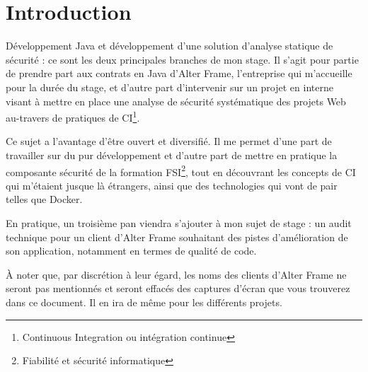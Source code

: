 \section*{Introduction}
Développement Java et développement d'une solution d'analyse statique de sécurité : ce sont les deux principales branches de mon stage. Il s'agit pour partie de prendre part aux contrats en Java d'Alter Frame, l'entreprise qui m'accueille pour la durée du stage, et d'autre part d'intervenir sur un projet en interne visant à mettre en place une analyse de sécurité systématique des projets Web au-travers de pratiques de CI\cite{ci_wiki}\footnote{Continuous Integration ou intégration continue}. 

Ce sujet a l'avantage d'être ouvert et diversifié. Il me permet d'une part de travailler sur du pur développement et d'autre part de mettre en pratique la composante sécurité de la formation FSI\cite{fsi}\footnote{Fiabilité et sécurité informatique}, tout en découvrant les concepts de CI qui m'étaient jusque là étrangers, ainsi que des technologies qui vont de pair telles que Docker.

En pratique, un troisième pan viendra s'ajouter à mon sujet de stage : un audit technique pour un client d'Alter Frame souhaitant des pistes d'amélioration de son application, notamment en termes de qualité de code. 

À noter que, par discrétion à leur égard, les noms des clients d'Alter Frame ne seront pas mentionnés et seront effacés des captures d'écran que vous trouverez dans ce document. Il en ira de même pour les différents projets.